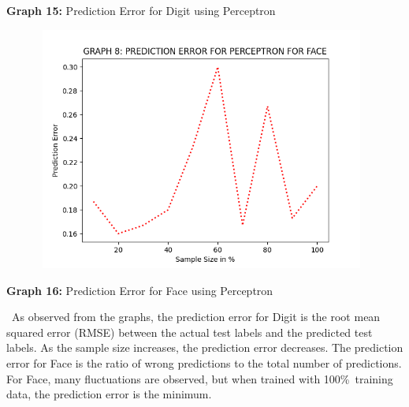 \documentclass[10 pt]{report}   	%
\begin{document}
{\begin{center}
\small \textbf {Graph 15:} Prediction Error for Digit using Perceptron\\
\end{center}
\begin{figure} [H]
\includegraphics [width = 11cm, height = 8cm]{PERC_PRED_FACE.png}
\end {figure}
\begin{center}
\small \textbf {Graph 16:} Prediction Error for Face using Perceptron\\
\end{center}
\textbullet\ {As observed from the graphs, the prediction error for Digit is the root mean squared error (RMSE) between the actual test labels and the predicted test labels. As the sample size increases, the prediction error decreases. The prediction error for Face is the ratio of wrong predictions to the total number of predictions. For Face, many fluctuations are observed, but when trained with 100\%\ training data, the prediction error is the minimum.}
}
\end{document}
